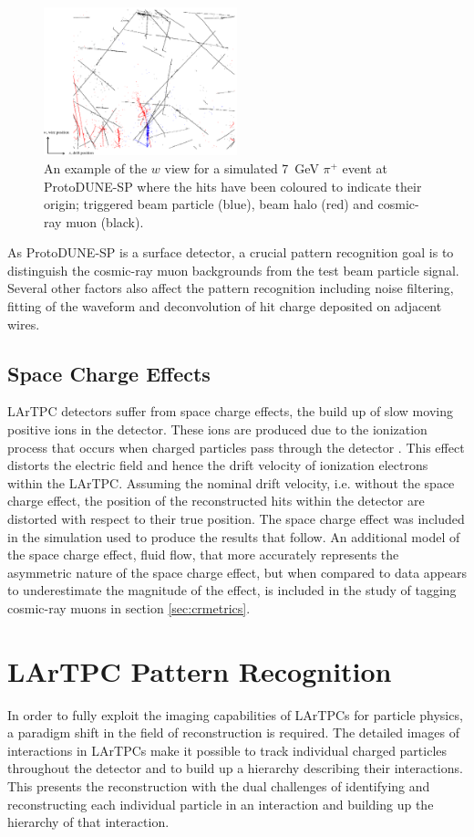 \begin{figure}
\centering
\includegraphics[width=0.5\textwidth]{Figures/EventDisplays/MC/EventComposition.pdf}
\caption{An example of the $w$ view for a simulated 7~GeV $\pi^{+}$ event at ProtoDUNE-SP where the hits have been coloured to indicate their origin; triggered beam particle (blue), beam halo (red) and cosmic-ray muon (black).}
\label{fig:eventdecomp}
\end{figure}

As ProtoDUNE-SP is a surface detector, a crucial pattern recognition goal is to distinguish the cosmic-ray muon backgrounds from the test beam particle signal.  Several other factors also affect the pattern recognition including noise filtering, fitting of the waveform and deconvolution of hit charge deposited on adjacent wires.  

\subsection{Space Charge Effects}
LArTPC detectors suffer from space charge effects, the build up of slow moving positive ions in the detector.  These ions are produced due to the ionization process that occurs when charged particles pass through the detector \cite{spacecharge}.  This effect distorts the electric field and hence the drift velocity of ionization electrons within the LArTPC.  Assuming the nominal drift velocity, i.e. without the space charge effect, the position of the reconstructed hits within the detector are distorted with respect to their true position.  The space charge effect was included in the simulation used to produce the results that follow.  An additional model of the space charge effect, fluid flow, that more accurately represents the asymmetric nature of the space charge effect, but when compared to data appears to underestimate the magnitude of the effect, is included in the study of tagging cosmic-ray muons in section \ref{sec:crmetrics}. 

\section{LArTPC Pattern Recognition}
\label{sec:patrec}
In order to fully exploit the imaging capabilities of LArTPCs for particle physics, a paradigm shift in the field of reconstruction is required.  The detailed images of interactions in LArTPCs make it possible to track individual charged particles throughout the detector and to build up a hierarchy describing their interactions.  This presents the reconstruction with the dual challenges of identifying and reconstructing each individual particle in an interaction and building up the hierarchy of that interaction.

